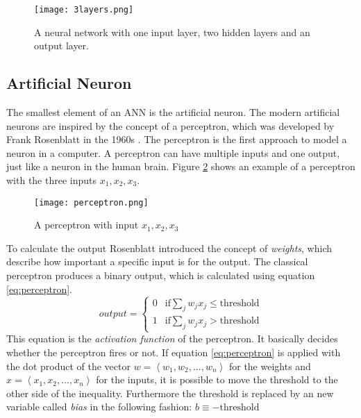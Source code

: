 \begin{figure}
\centering
  \texttt{[image: 3layers.png]}
  \caption{A neural network with one input layer, two hidden layers and an output layer.\cite{Nielsen2015}}
  \label{fig:3layers}
\end{figure}

\subsection{Artificial Neuron}\label{artificialNeuron}
The smallest element of an ANN is the artificial neuron.
The modern artificial neurons are inspired by the concept of a perceptron, which was developed by Frank Rosenblatt in the 1960s \cite{rosenblatt1962principles}.
The perceptron is the first approach to model a neuron in a computer.
A perceptron can have multiple inputs and one output, just like a neuron in the human brain.
Figure \ref{fig:perceptron} shows an example of a perceptron with the three inputs $x_1, x_2, x_3$.

\begin{figure}
\centering
  \texttt{[image: perceptron.png]}
  \caption{A perceptron with input $x_1, x_2, x_3$ \cite{Nielsen2015}}
  \label{fig:perceptron}
\end{figure}

To calculate the output Rosenblatt introduced the concept of \emph{weights}, which describe how important a specific input is for the output.
The classical perceptron produces a binary output, which is calculated using equation \ref{eq:perceptron}.
\begin{equation}\label{eq:perceptron}
output = \left\{\begin{matrix}
0 & \mathrm{if} \sum _j w_j  x_j\leq \mathrm{threshold}\\ 
1 & \mathrm{if} \sum _j w_j  x_j>  \mathrm{threshold}
\end{matrix}\right.
\end{equation}
This equation is the \emph{activation function} of the perceptron. 
It basically decides whether the perceptron fires or not.
If equation \ref{eq:perceptron} is applied with the dot product of the vector $w = \left\langle w_1, w_2, ..., w_n  \right\rangle$ for the weights and $x = \left\langle x_1, x_2, ..., x_n  \right\rangle$ for the inputs, it is possible to move the threshold to the other side of the inequality. Furthermore the threshold is replaced by an new variable called \emph{bias} in the following fashion: $b \equiv -\mathrm{threshold}$

